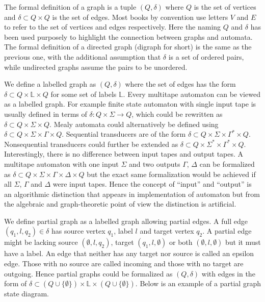 The formal definition of a graph is a tuple $(Q,\delta)$ where $Q$ is the  set of vertices and $\delta\subset Q\times Q$ is the set of edges. Most books by convention use letters $V$ and $E$ to refer to the set of vertices and edges respectively. Here the naming $Q$ and $\delta$ has been used purposely to highlight the connection between graphs and automata. The formal definition of a directed graph (digraph for short) is the same as the previous one, with the additional assumption that $\delta$ is a set of ordered pairs, while undirected graphs assume the pairs to be unordered. 

We define a labelled graph as $(Q,\delta)$ where the set of edges has the form  $\delta \subset Q \times \mathbb{L} \times Q$ for some set of labels $\mathbb{L}$. Every multitape automaton can be viewed as a labelled graph. For example finite state automaton with single input tape is usually defined in terms of $\delta : Q \times \Sigma \rightarrow Q $, which could be rewritten as $\delta \subset Q \times \Sigma \times Q$. Mealy automata could alternatively be defined using $\delta \subset Q \times \Sigma \times \Gamma \times Q$. Sequential transducers are of the form $\delta \subset Q \times \Sigma \times \Gamma^* \times Q$. Nonsequential transducers could further be extended as $\delta \subset Q \times \Sigma^* \times \Gamma^* \times Q$. Interestingly, there is no difference between input tapes and output tapes. A multitape automaton with one input  $\Sigma$ and two outputs $\Gamma$, $\Delta$ can be formalized as $\delta \subset Q \times \Sigma \times \Gamma \times \Delta \times Q$ but the exact same formalization would be achieved if all $\Sigma$, $\Gamma$ and $\Delta$ were input tapes. Hence the concept of ``input'' and ``output'' is an algorithmic distinction that appears in implementation of automaton but from the algebraic and graph-theoretic point of view the distinction is artificial. 

We define partial graph as a labelled graph allowing partial edges. A full edge $(q_1,l,q_2) \in \delta$ has source vertex $q_1$, label $l$ and target vertex $q_2$. A partial edge might be lacking source $(\emptyset,l,q_2)$, target $(q_1,l,\emptyset)$ or both $(\emptyset,l,\emptyset)$ but it must have a label. An edge  that neither has any target nor source is called an epsilon edge. Those with no source are called incoming and those with no target are outgoing. Hence partial graphs could be formalized as $(Q,\delta)$ with edges in the form of $\delta \subset (Q \cup \{\emptyset\}) \times \mathbb{L} \times  (Q \cup \{\emptyset\})$. Below is an example of a partial graph state diagram.


